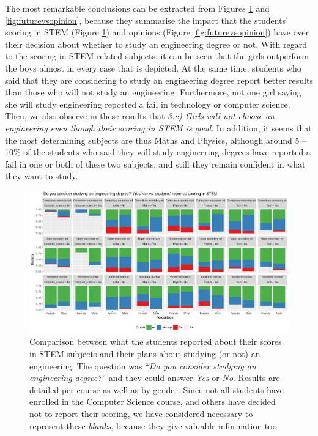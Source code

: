 \documentclass[journal,transmag]{IEEEtran}
\begin{document}
The most remarkable conclusions can be extracted from Figures \ref{fig:futurevsscore} and \ref{fig:futurevsopinion}, because they summarise the impact that the students' scoring in STEM (Figure \ref{fig:futurevsscore}) and opinions (Figure \ref{fig:futurevsopinion}) have over their decision about whether to study an engineering degree or not. With regard to the scoring in STEM-related subjects, it can be seen that the girls outperform the boys almost in every case that is depicted. At the same time, students who said that they are considering to study an engineering degree report better results than those who will not study an engineering. Furthermore, not one girl saying she will study engineering reported a fail in technology or computer science. Then, we also observe in these results that \textit{3.c) Girls will not choose an engineering even though their scoring in STEM is good}. In addition, it seems that the most determining subjects are thus Maths and Physics, although around 5 -- 10\% of the students who said they will study engineering degrees have reported a fail in one or both of these two subjects, and still they remain confident in what they want to study.

\begin{figure}
	\centering
	\includegraphics[width=1\textwidth]{img/future_vs_scoringSTEM.pdf}
	\caption{Comparison between what the students reported about their scores in STEM subjects and their plans about studying (or not) an engineering. The question was ``\textit{Do you consider studying an engineering degree?}'' and they could answer \textit{Yes} or \textit{No}. Results are detailed per course as well as by gender. Since not all students have enrolled in the Computer Science course, and others have decided not to report their scoring, we have considered necessary to represent these \textit{blanks}, because they give valuable information too.}
	\label{fig:futurevsscore}
\end{figure}
\end{document}
